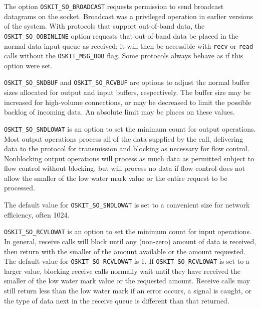 \begin{apiparm}
	The option \texttt{OSKIT_SO_BROADCAST} requests permission to send 
	broadcast datagrams on the socket.  Broadcast was a privileged 
	operation in earlier versions of the system.  With protocols that 
	support out-of-band data, the \texttt{OSKIT_SO_OOBINLINE} option 
	requests that out-of-band data be placed in the normal data input 
	queue as received; it will then be accessible with \texttt{recv}
	or \texttt{read} calls without the \texttt{OSKIT_MSG_OOB} flag.  
	Some protocols always behave as if this option were set.  

	\texttt{OSKIT_SO_SNDBUF} and \texttt{OSKIT_SO_RCVBUF} are options 
	to adjust the normal buffer sizes allocated for output and input 
	buffers, respectively.  The buffer size may be increased for 
	high-volume connections, or may be decreased to limit the possible 
	backlog of incoming data.  An absolute limit may be places on 
	these values.

	\texttt{OSKIT_SO_SNDLOWAT} is an option to set the minimum count 
	for output operations. Most output operations process all of the 
	data supplied by the call, delivering data to the protocol for 
	transmission and blocking as necessary for flow control.  
	Nonblocking output operations will process as much data as permitted 
	subject to flow control without blocking, but will process no data 
	if flow control does not allow the smaller of the low water
	mark value or the entire request to be processed.  


	The default value for \texttt{OSKIT_SO_SNDLOWAT}
	is set to a convenient size for network efficiency, often 1024.

        \texttt{OSKIT_SO_RCVLOWAT} is an option to set the minimum count 
	for input operations.
	In general, receive calls will block until any (non-zero) amount of data
	is received, then return with the smaller of the amount available or the
	amount requested.  The default value for \texttt{OSKIT_SO_RCVLOWAT} is 1.
	If \texttt{OSKIT_SO_RCVLOWAT} is set to a larger value, blocking 
	receive calls normally wait until they have received the smaller of 
	the low water mark value or the requested amount.  Receive calls may 
	still return less than the low water mark if an error occurs, a signal 
	is caught, or the type of data next in the receive queue is different 
	than that returned.


\end{apiparm}
